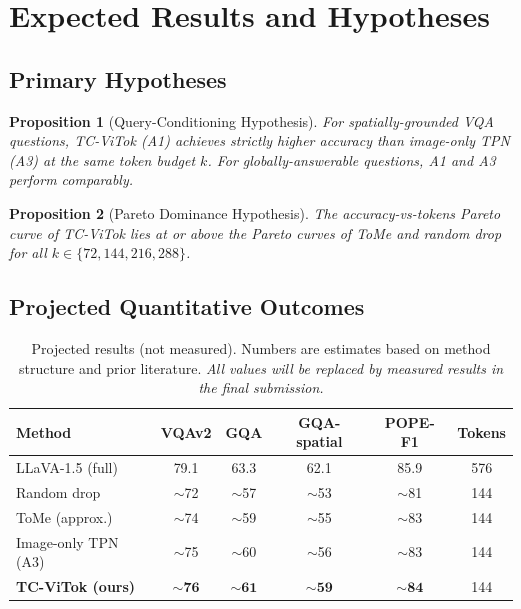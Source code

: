 \documentclass[12pt,a4paper]{article}
\newtheorem{proposition}{Proposition}
\begin{document}
\section{Expected Results and Hypotheses}
\label{sec:results}

\subsection{Primary Hypotheses}

\begin{proposition}[Query-Conditioning Hypothesis]
  For spatially-grounded VQA questions, TC-ViTok (A1) achieves strictly higher
  accuracy than image-only TPN (A3) at the same token budget $k$. For
  globally-answerable questions, A1 and A3 perform comparably.
  \label{prop:main}
\end{proposition}

\begin{proposition}[Pareto Dominance Hypothesis]
  The accuracy-vs-tokens Pareto curve of TC-ViTok lies at or above the Pareto
  curves of ToMe and random drop for all $k \in \{72, 144, 216, 288\}$.
  \label{prop:pareto}
\end{proposition}

\subsection{Projected Quantitative Outcomes}

\begin{table}[h]
\centering
\caption{Projected results (not measured). Numbers are estimates based on method
structure and prior literature. \emph{All values will be replaced by measured
results in the final submission.}}
\label{tab:projected}
\renewcommand{\arraystretch}{1.2}
\begin{tabular}{@{}lccccc@{}}
  \toprule
  Method & VQAv2 & GQA & GQA-spatial & POPE-F1 & Tokens \\
  \midrule
  LLaVA-1.5 (full)    & 79.1 & 63.3 & 62.1 & 85.9 & 576 \\
  Random drop         & $\sim$72 & $\sim$57 & $\sim$53 & $\sim$81 & 144 \\
  ToMe (approx.)      & $\sim$74 & $\sim$59 & $\sim$55 & $\sim$83 & 144 \\
  Image-only TPN (A3) & $\sim$75 & $\sim$60 & $\sim$56 & $\sim$83 & 144 \\
  \textbf{TC-ViTok (ours)} & $\mathbf{\sim76}$ & $\mathbf{\sim61}$
    & $\mathbf{\sim59}$ & $\mathbf{\sim84}$ & 144 \\
  \bottomrule
\end{tabular}
\end{table}
\end{document}
